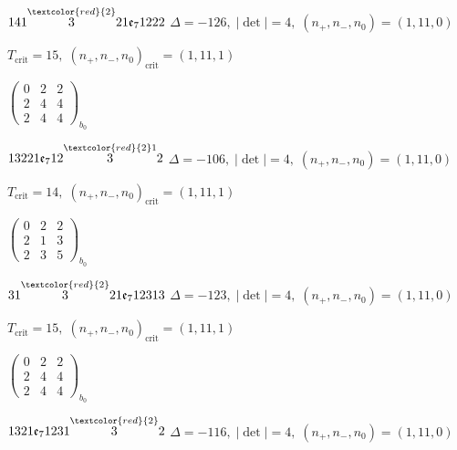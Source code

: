 \documentclass[10pt]{article}
\begin{document}
\smallskip

$141\overset{\textcolor{red}{2}}{3}21\mathfrak{e}_71222$ \quad $\Delta=-126,\; |\det|=4,\; (n_+,n_-,n_0)=(1,11,0)$

\hspace{1em}$T_{\text{crit}}=15,\; (n_+,n_-,n_0)_{\text{crit}}=(1,11,1)$

\hspace{2em}$\left(\begin{smallmatrix}0 & 2 & 2 \\ 2 & 4 & 4 \\ 2 & 4 & 4\end{smallmatrix}\right)_{\!b_0}$

\smallskip

$13221\mathfrak{e}_712\overset{\textcolor{red}{2}1}{3}2$ \quad $\Delta=-106,\; |\det|=4,\; (n_+,n_-,n_0)=(1,11,0)$

\hspace{1em}$T_{\text{crit}}=14,\; (n_+,n_-,n_0)_{\text{crit}}=(1,11,1)$

\hspace{2em}$\left(\begin{smallmatrix}0 & 2 & 2 \\ 2 & 1 & 3 \\ 2 & 3 & 5\end{smallmatrix}\right)_{\!b_0}$

\smallskip

$31\overset{\textcolor{red}{2}}{3}21\mathfrak{e}_712313$ \quad $\Delta=-123,\; |\det|=4,\; (n_+,n_-,n_0)=(1,11,0)$

\hspace{1em}$T_{\text{crit}}=15,\; (n_+,n_-,n_0)_{\text{crit}}=(1,11,1)$

\hspace{2em}$\left(\begin{smallmatrix}0 & 2 & 2 \\ 2 & 4 & 4 \\ 2 & 4 & 4\end{smallmatrix}\right)_{\!b_0}$

\smallskip

$1321\mathfrak{e}_71231\overset{\textcolor{red}{2}}{3}2$ \quad $\Delta=-116,\; |\det|=4,\; (n_+,n_-,n_0)=(1,11,0)$
\end{document}

